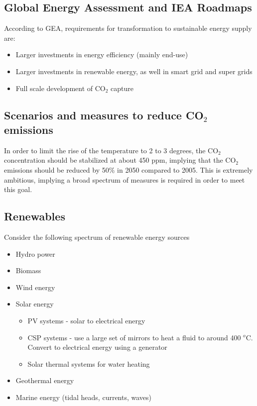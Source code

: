 \documentclass[a4paper,10pt]{article}
\begin{document}
\subsection{Global Energy Assessment and IEA Roadmaps}
According to GEA, requirements for transformation to sustainable energy supply are:
\begin{itemize}
 \item Larger investments in energy efficiency (mainly end-use)
 \item Larger investments in renewable energy, as well in smart grid and super grids
 \item Full scale development of CO$_2$ capture
\end{itemize}

\subsection{Scenarios and measures to reduce CO$_2$ emissions}

In order to limit the rise of the temperature to 2 to 3 degrees, the CO$_2$ concentration should be stabilized at about 450 ppm, implying that the CO$_2$ emissions should be reduced by 50\% in 2050 compared to 2005. This is extremely ambitious, implying a broad spectrum of measures is required in order to meet this goal. 

\subsection{Renewables}
Consider the following spectrum of renewable energy sources
\begin{itemize}
 \item Hydro power
 \item Biomass
 \item Wind energy
 \item Solar energy
 \begin{itemize}
 \item PV systems - solar to electrical energy
 \item CSP systems - use a large set of mirrors to heat a fluid to around 400 $^o$C. Convert to electrical energy using a generator
 \item Solar thermal systems for water heating
 \end{itemize}
 \item Geothermal energy
 \item Marine energy (tidal heads, currents, waves)
\end{itemize}
\end{document}
